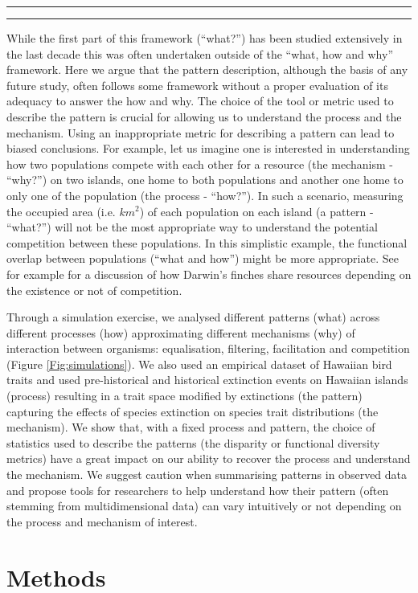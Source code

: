 \documentclass[12pt,letterpaper]{article}
\begin{document}
\bigskip
\hrule
\hrule
\bigskip

While the first part of this framework (``what?'') has been studied extensively in the last decade this was often undertaken outside of the ``what, how and why'' framework.
Here we argue that the pattern description, although the basis of any future study, often follows some framework without a proper evaluation of its adequacy to answer the how and why.
The choice of the tool or metric used to describe the pattern is crucial for allowing us to understand the process and the mechanism.
Using an inappropriate metric for describing a pattern can lead to biased conclusions.
For example, let us imagine one is interested in understanding how two populations compete with each other for a resource (the mechanism - ``why?'') on two islands, one home to both populations and another one home to only one of the population (the process - ``how?'').
In such a scenario, measuring the occupied area (i.e. $km^{2}$) of each population on each island (a pattern - ``what?'') will not be the most appropriate way to understand the potential competition between these populations.
In this simplistic example, the functional overlap between populations (``what and how'') might be more appropriate.
See for example \citealt{carvalho2020decomposing} for a discussion of how Darwin's finches share resources depending on the existence or not of competition.

Through a simulation exercise, we analysed different patterns (what) across different processes (how) approximating different mechanisms (why) of interaction between organisms: equalisation, filtering, facilitation and competition (Figure \ref{Fig:simulations}).
We also used an empirical dataset of Hawaiian bird traits and used pre-historical and historical extinction events on Hawaiian islands (process) resulting in a trait space modified by extinctions (the pattern) capturing the effects of species extinction on species trait distributions (the mechanism).
We show that, with a fixed process and pattern, the choice of statistics used to describe the patterns (the disparity or functional diversity metrics) have a great impact on our ability to recover the process and understand the mechanism.
We suggest caution when summarising patterns in observed data and propose tools for researchers to help understand how their pattern (often stemming from multidimensional data) can vary intuitively or not depending on the process and mechanism of interest.

\section{Methods}
\end{document}
